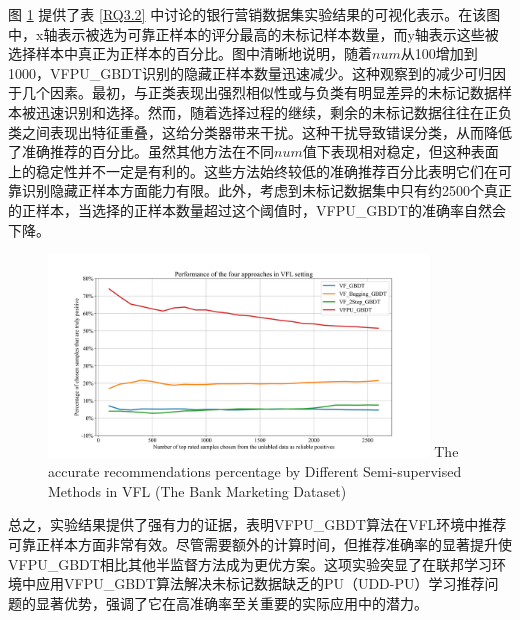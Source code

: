 图  \ref{fig:GBDT} 提供了表 \ref{RQ3.2} 中讨论的银行营销数据集实验结果的可视化表示。在该图中，x轴表示被选为可靠正样本的评分最高的未标记样本数量，而y轴表示这些被选择样本中真正为正样本的百分比。图中清晰地说明，随着$num$从100增加到1000，VFPU\_GBDT识别的隐藏正样本数量迅速减少。这种观察到的减少可归因于几个因素。最初，与正类表现出强烈相似性或与负类有明显差异的未标记数据样本被迅速识别和选择。然而，随着选择过程的继续，剩余的未标记数据往往在正负类之间表现出特征重叠，这给分类器带来干扰。这种干扰导致错误分类，从而降低了准确推荐的百分比。虽然其他方法在不同$num$值下表现相对稳定，但这种表面上的稳定性并不一定是有利的。这些方法始终较低的准确推荐百分比表明它们在可靠识别隐藏正样本方面能力有限。此外，考虑到未标记数据集中只有约2500个真正的正样本，当选择的正样本数量超过这个阈值时，VFPU\_GBDT的准确率自然会下降。


\begin{figure}[h]
	\centering 
	\includegraphics[width=0.9\textwidth]{chapters/imgs/Figure 5 in JPEG format}
	{\centering \wuhao The accurate recommendations percentage by Different Semi-supervised Methods in VFL (The Bank Marketing Dataset)}
	\label{fig:GBDT}
\end{figure}


总之，实验结果提供了强有力的证据，表明VFPU\_GBDT算法在VFL环境中推荐可靠正样本方面非常有效。尽管需要额外的计算时间，但推荐准确率的显著提升使VFPU\_GBDT相比其他半监督方法成为更优方案。这项实验突显了在联邦学习环境中应用VFPU\_GBDT算法解决未标记数据缺乏的PU（UDD-PU）学习推荐问题的显著优势，强调了它在高准确率至关重要的实际应用中的潜力。
